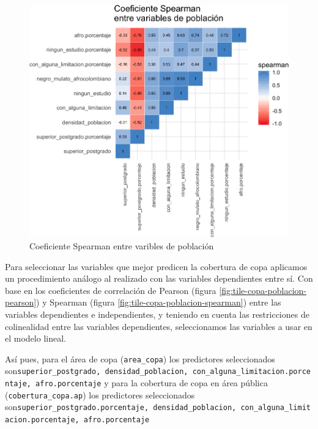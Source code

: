 \documentclass[12pt,]{book}
\begin{document}
\begin{figure}
\includegraphics[width=1\linewidth]{tesis-unigis_files/figure-latex/tile-poblacion-spearman-1} \caption{Coeficiente Spearman entre varibles de población}\label{fig:tile-poblacion-spearman}
\end{figure}

Para seleccionar las variables que mejor predicen la cobertura de copa
aplicamos un procedimiento análogo al realizado con las variables
dependientes entre sí. Con base en los coeficientes de correlación de
Pearson (figura \ref{fig:tile-copa-poblacion-pearson}) y Spearman
(figura \ref{fig:tile-copa-poblacion-spearman}) entre las variables
dependientes e independientes, y teniendo en cuenta las restricciones de
colinealidad entre las variables dependientes, seleccionamos las
variables a usar en el modelo lineal.

Así pues, para el área de copa (\texttt{area\_copa}) los predictores
seleccionados
son\texttt{superior\_postgrado,\ densidad\_poblacion,\ con\_alguna\_limitacion.porcentaje,\ afro.porcentaje}
y para la cobertura de copa en área pública
(\texttt{cobertura\_copa.ap}) los predictores seleccionados
son\texttt{superior\_postgrado.porcentaje,\ densidad\_poblacion,\ con\_alguna\_limitacion.porcentaje,\ afro.porcentaje}
\end{document}
